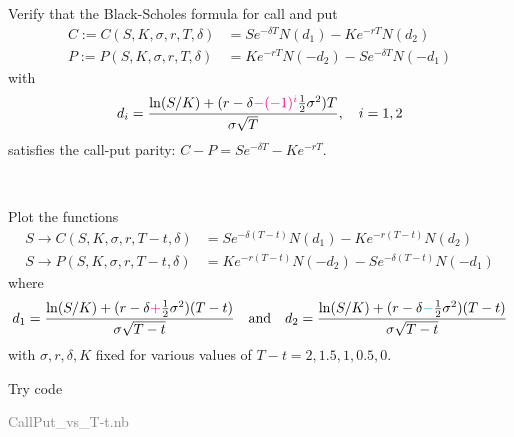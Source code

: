 \begin{frame}[fragile,t]
\begin{myexample}
Verify that the Black-Scholes formula for call and put
\begin{align*}
	C:= C(S,K,\sigma,r,T,\delta) & = S e^{-\delta T}N(d_1)-K e^{-rT}N(d_2) \\
	P:= P(S,K,\sigma,r,T,\delta)  & = K e^{-rT}N(-d_2) - S e^{-\delta T}N(-d_1)
\end{align*}
with
\begin{align*}
	d_i=\frac{\ln(S/K)+(r-\delta\textcolor{magenta}{-(-1)^i}\frac{1}{2}\sigma^2)T}{\sigma \sqrt{T}}, \quad i=1,2
\end{align*}
satisfies the call-put parity: $C - P = S e^{-\delta T} - K e^{-r T}$.
\end{myexample}
\begin{mysol}
	\phantom{a}\\
	\vfill\myEnd
\end{mysol}
\end{frame}
\begin{frame}[fragile,t]
	\begin{myexample}
		Plot the functions
		\begin{align*}
			S \to C(S,K,\sigma,r,T-t,\delta) & = S e^{-\delta (T-t)}N(d_1)-K e^{-r(T-t)}N(d_2) \\
			S \to P(S,K,\sigma,r,T-t,\delta)   & = K e^{-r(T-t)}N(-d_2) - S e^{-\delta (T-t)}N(-d_1)
		\end{align*}
		where
		\begin{equation*}
			d_1=\frac{\ln(S/K)+(r-\delta\textcolor{magenta}{+}\frac{1}{2}\sigma^2)(T-t)}{\sigma \sqrt{T-t}} \quad \text{and} \quad
			d_2=\frac{\ln(S/K)+(r-\delta\textcolor{cyan}{-}\frac{1}{2}\sigma^2)(T-t)}{\sigma \sqrt{T-t}}
		\end{equation*}
		with $\sigma, r, \delta, K$ fixed for various values of $T-t=2, 1.5, 1, 0.5, 0$.
	\end{myexample}
	\bigskip
	\begin{mysol}
		Try code \\
		\begin{center}
			\textcolor{gray}{CallPut\_vs\_T-t.nb}
		\end{center}
		\myEnd
	\end{mysol}
\end{frame}
